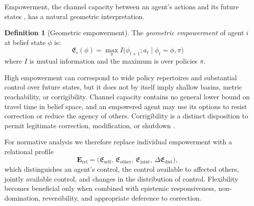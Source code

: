 \documentclass[11pt,a4paper]{article}
\theoremstyle{definition}
\newtheorem{definition}[claim]{Definition}
\begin{document}
Empowerment, the channel capacity between an agent's actions and its future states \citep{klyubin2005empowerment}, has a natural geometric interpretation.

\begin{definition}[Geometric empowerment]
\label{def:geo_empowerment}
The \emph{geometric empowerment} of agent $i$ at belief state $\phi$ is:
\begin{equation}
  \mathfrak{E}_i(\phi) = \max_{\pi} I\bigl(\phi_{t+1}; a_t \mid \phi_t = \phi, \pi\bigr)
  \label{eq:empowerment}
\end{equation}
where $I$ is mutual information and the maximum is over policies $\pi$.
\end{definition}

High empowerment can correspond to wide policy repertoires and substantial control over future states, but it does not by itself imply shallow basins, metric reachability, or corrigibility. Channel capacity contains no general lower bound on travel time in belief space, and an empowered agent may use its options to resist correction or reduce the agency of others. Corrigibility is a distinct disposition to permit legitimate correction, modification, or shutdown \citep{soares2015corrigibility}.

For normative analysis we therefore replace individual empowerment with a relational profile
\begin{equation}
  \mathbf{E}_{\mathrm{rel}} = \bigl(\mathfrak{E}_{\mathrm{self}},\, \mathfrak{E}_{\mathrm{other}},\, \mathfrak{E}_{\mathrm{joint}},\, \Delta\mathfrak{E}_{\mathrm{dist}}\bigr),
  \label{eq:relational_empowerment}
\end{equation}
which distinguishes an agent's control, the control available to affected others, jointly available control, and changes in the distribution of control. Flexibility becomes beneficial only when combined with epistemic responsiveness, non-domination, reversibility, and appropriate deference to correction.
\end{document}
